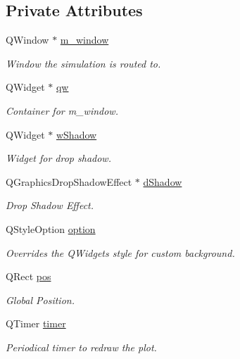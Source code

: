 \subsection*{Private Attributes}
\begin{DoxyCompactItemize}
\item 
Q\+Window $\ast$ \mbox{\hyperlink{classSmoke_a75cc318af83d2cf39a6609b8becafe38}{m\+\_\+window}}
\begin{DoxyCompactList}\small\item\em Window the simulation is routed to. \end{DoxyCompactList}\item 
Q\+Widget $\ast$ \mbox{\hyperlink{classSmoke_ae04389450b60548adaf2ff0e76399673}{qw}}
\begin{DoxyCompactList}\small\item\em Container for m\+\_\+window. \end{DoxyCompactList}\item 
Q\+Widget $\ast$ \mbox{\hyperlink{classSmoke_aa6b959618b43da0106cc49148be321e8}{w\+Shadow}}
\begin{DoxyCompactList}\small\item\em Widget for drop shadow. \end{DoxyCompactList}\item 
Q\+Graphics\+Drop\+Shadow\+Effect $\ast$ \mbox{\hyperlink{classSmoke_a26f011df30f860db285ef97713ca7989}{d\+Shadow}}
\begin{DoxyCompactList}\small\item\em Drop Shadow Effect. \end{DoxyCompactList}\item 
Q\+Style\+Option \mbox{\hyperlink{classSmoke_adaf76ba29af2bc7105de57280a7e0993}{option}}
\begin{DoxyCompactList}\small\item\em Overrides the Q\+Widget\textquotesingle{}s style for custom background. \end{DoxyCompactList}\item 
Q\+Rect \mbox{\hyperlink{classSmoke_ae762c3ace8ef3b2aafab01e1c28f7523}{pos}}
\begin{DoxyCompactList}\small\item\em Global Position. \end{DoxyCompactList}\item 
Q\+Timer \mbox{\hyperlink{classSmoke_ab86a0c9a3d30df9136fd8b2cb0c875ad}{timer}}
\begin{DoxyCompactList}\small\item\em Periodical timer to redraw the plot. \end{DoxyCompactList}\item 

\end{DoxyCompactItemize}
